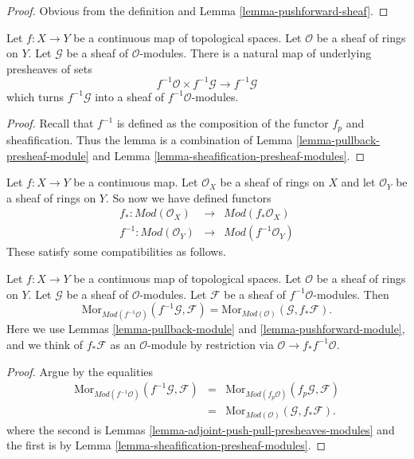 \begin{proof}
Obvious from the definition and Lemma \ref{lemma-pushforward-sheaf}.
\end{proof}

\begin{lemma}
\label{lemma-pullback-module}
Let $f : X \to Y$ be a continuous map of topological spaces.
Let $\mathcal{O}$ be a sheaf of rings on $Y$. Let
$\mathcal{G}$ be a sheaf of $\mathcal{O}$-modules.
There is a natural map of underlying presheaves of sets
$$
f^{-1}\mathcal{O} \times f^{-1}\mathcal{G}
\longrightarrow
f^{-1}\mathcal{G}
$$
which turns $f^{-1}\mathcal{G}$ into a
sheaf of $f^{-1}\mathcal{O}$-modules.
\end{lemma}

\begin{proof}
Recall that $f^{-1}$ is defined as the composition of the
functor $f_p$ and sheafification. Thus the lemma
is a combination of Lemma \ref{lemma-pullback-presheaf-module}
and Lemma \ref{lemma-sheafification-presheaf-modules}.
\end{proof}

\noindent
Let $f : X \to Y$ be a continuous map.
Let $\mathcal{O}_X$ be a sheaf of rings on $X$ and
let $\mathcal{O}_Y$ be a sheaf of rings on $Y$.
So now we have defined functors
\begin{eqnarray*}
f_* : \textit{Mod}(\mathcal{O}_X) &
\longrightarrow &
\textit{Mod}(f_*\mathcal{O}_X) \\
f^{-1} : \textit{Mod}(\mathcal{O}_Y) &
\longrightarrow &
\textit{Mod}(f^{-1}\mathcal{O}_Y)
\end{eqnarray*}
These satisfy some compatibilities as follows.

\begin{lemma}
\label{lemma-adjoint-push-pull-modules}
Let $f : X \to Y$ be a continuous map of topological spaces.
Let $\mathcal{O}$ be a sheaf of rings on $Y$.
Let $\mathcal{G}$ be a sheaf of $\mathcal{O}$-modules.
Let $\mathcal{F}$ be a sheaf of $f^{-1}\mathcal{O}$-modules.
Then
$$
\text{Mor}_{\textit{Mod}(f^{-1}\mathcal{O})}(f^{-1}\mathcal{G}, \mathcal{F})
=
\text{Mor}_{\textit{Mod}(\mathcal{O})}(\mathcal{G}, f_*\mathcal{F}).
$$
Here we use
Lemmas \ref{lemma-pullback-module}
and \ref{lemma-pushforward-module}, and we think of
$f_*\mathcal{F}$ as an $\mathcal{O}$-module by restriction via
$\mathcal{O} \to f_*f^{-1}\mathcal{O}$.
\end{lemma}

\begin{proof}
Argue by the equalities
\begin{eqnarray*}
\text{Mor}_{\textit{Mod}(f^{-1}\mathcal{O})}(f^{-1}\mathcal{G}, \mathcal{F})
& = &
\text{Mor}_{\textit{Mod}(f_p\mathcal{O})}(f_p\mathcal{G}, \mathcal{F}) \\
& = &
\text{Mor}_{\textit{Mod}(\mathcal{O})}(\mathcal{G}, f_*\mathcal{F}).
\end{eqnarray*}
where the second is
Lemmas \ref{lemma-adjoint-push-pull-presheaves-modules}
and the first is by Lemma \ref{lemma-sheafification-presheaf-modules}.
\end{proof}


